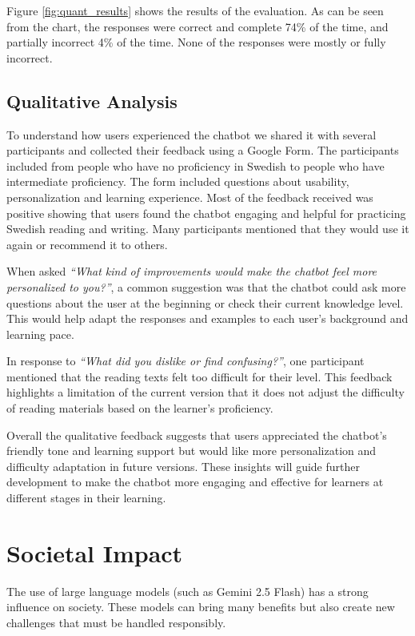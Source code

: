 \documentclass[a4paper,10pt]{article}
\begin{document}
Figure \ref{fig:quant_results} shows the results of the evaluation. As can be seen from the chart, the responses were correct and complete 74\% of the time, and partially incorrect 4\% of the time. None of the responses were mostly or fully incorrect. 

\subsection{Qualitative Analysis}

To understand how users experienced the chatbot we shared it with several participants and collected their feedback using a Google Form. The participants included from people who have no proficiency in Swedish to people who have intermediate proficiency. The form included questions about usability, personalization and learning experience. Most of the feedback received was positive showing that users found the chatbot engaging and helpful for practicing Swedish reading and writing. Many participants mentioned that they would use it again or recommend it to others.

When asked \textit{“What kind of improvements would make the chatbot feel more personalized to you?”}, a common suggestion was that the chatbot could ask more questions about the user at the beginning or check their current knowledge level. This would help adapt the responses and examples to each user’s background and learning pace.

In response to \textit{“What did you dislike or find confusing?”}, one participant mentioned that the reading texts felt too difficult for their level. This feedback highlights a limitation of the current version that it does not adjust the difficulty of reading materials based on the learner’s proficiency.

Overall the qualitative feedback suggests that users appreciated the chatbot’s friendly tone and learning support but would like more personalization and difficulty adaptation in future versions. These insights will guide further development to make the chatbot more engaging and effective for learners at different stages in their learning.

\section{Societal Impact}
The use of large language models (such as Gemini 2.5 Flash) has a strong influence on society. These models can bring many benefits but also create new challenges that must be handled responsibly.
\end{document}

